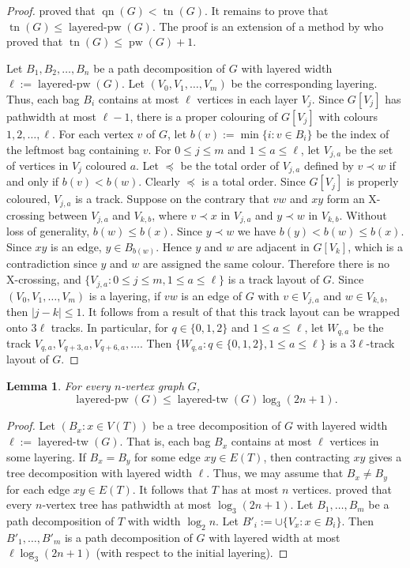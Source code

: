 \documentclass[a4paper,11pt]{article}
\DeclareMathOperator{\tn}{tn}
\DeclareMathOperator{\qn}{qn}
\DeclareMathOperator{\pw}{pw}
\DeclareMathOperator{\pb}{layered-pw}
\DeclareMathOperator{\tb}{layered-tw}
\theoremstyle{plain}
\newtheorem{lemma}[theorem]{Lemma}
\theoremstyle{definition}
\begin{document}
\begin{proof}
\citet{DMW05} proved that $\qn(G)<\tn(G)$. It remains to prove that $\tn(G)\leq \pb(G)$. The proof is an extension of a method by \citet{DMW05} who proved that $\tn(G)\leq\pw(G)+1$. 

Let $B_1,B_2,\dots,B_n$ be a path decomposition of $G$ with layered width $\ell:=\pb(G)$. Let $(V_0,V_1,\dots,V_m)$ be the corresponding layering. Thus, each bag $B_i$ contains at most $\ell$ vertices in each layer $V_j$. Since $G[V_j]$ has pathwidth at most $\ell-1$, there is a proper colouring of $G[V_j]$ with colours $1,2,\dots,\ell$. 
For each vertex $v$ of $G$, let $b(v):=\min\{i:v\in B_i\}$ be the index of the leftmost bag containing $v$. 
For $0\leq j\leq m$ and $1\leq a\leq\ell$, let $V_{j,a}$ be the set of vertices in $V_j$ coloured $a$. 
Let $\preceq$ be the total order of $V_{j,a}$ defined by $v\prec w$ if and only if $b(v)< b(w)$. 
Clearly $\preceq$ is a total order. Since $G[V_j]$ is properly coloured, $V_{j,a}$ is a track. 
Suppose on the contrary that $vw$ and $xy$ form an X-crossing between $V_{j,a}$ and $V_{k,b}$, where $v\prec x$ in $V_{j,a}$ and $y\prec w$ in $V_{k,b}$. Without loss of generality, $b(w)\leq b(x)$. Since $y\prec w$ we have $b(y)<b(w)\leq b(x)$. Since $xy$ is an edge, $y\in B_{b(w)}$. Hence $y$ and $w$ are adjacent in $G[V_k]$, which is a contradiction since $y$ and $w$ are assigned the same colour. Therefore there is no X-crossing, and $\{V_{j,a}:0\leq j\leq m,1\leq a\leq \ell\}$ is a track layout of $G$. Since $(V_0,V_1,\dots,V_m)$ is a layering, if $vw$ is an edge of $G$ with $v\in V_{j,a}$ and $w\in V_{k,b}$, then $|j-k|\leq 1$. It follows from a result of \citet[Lemma~6 with $s=1$]{DPW04} that this track layout can be wrapped onto $3\ell$ tracks. In particular, for $q\in\{0,1,2\}$ and $1\leq a\leq \ell$, let $W_{q,a}$ be the track $V_{q,a},V_{q+3,a},V_{q+6,a},\dots$. Then $\{W_{q,a}:q\in\{0,1,2\},1\leq a\leq \ell\}$ is a $3\ell$-track layout of $G$. 
\end{proof}


\begin{lemma}
\label{log}
For every $n$-vertex graph $G$, $$\pb(G)\leq \tb(G)\log_3(2n+1).$$
\end{lemma}

\begin{proof} 
Let $(B_x:x\in V(T))$ be a tree decomposition  of $G$ with layered width $\ell:=\tb(G)$.  That is, each bag $B_x$ contains at most $\ell$ vertices in some layering. If $B_x=B_y$ for some edge $xy\in E(T)$, then contracting $xy$ gives a tree decomposition with layered width $\ell$. Thus, we may assume that $B_x\neq B_y$ for each edge $xy\in E(T)$. It follows that $T$ has at most $n$ vertices. \citet{Sch92} proved that every $n$-vertex tree has pathwidth at most $\log_3(2n+1)$. Let $B_1,\dots,B_m$ be a path decomposition of $T$ with width $\log_2 n$. Let $B'_i:=\cup\{V_x:x\in B_i\}$. Then  $B'_1,\dots,B'_m$ is a path decomposition of $G$ with layered width at most $\ell\log_3(2n+1)$ (with respect to the initial layering). 
\end{proof}
\end{document}
